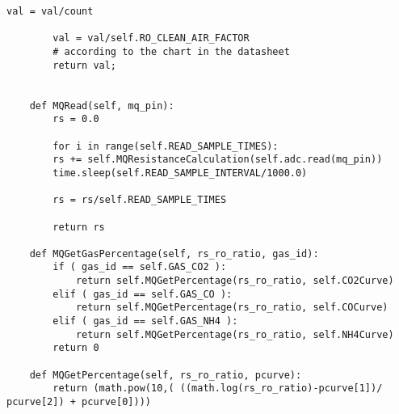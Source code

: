 \begin{lstlisting}[label=list:MQClass, caption={Auswertung der MQ-Sensorwerte}]
		val = val/count                                         
	
		val = val/self.RO_CLEAN_AIR_FACTOR                     
		# according to the chart in the datasheet 
		return val;
	
	
	def MQRead(self, mq_pin):
		rs = 0.0
		
		for i in range(self.READ_SAMPLE_TIMES):
		rs += self.MQResistanceCalculation(self.adc.read(mq_pin))
		time.sleep(self.READ_SAMPLE_INTERVAL/1000.0)
		
		rs = rs/self.READ_SAMPLE_TIMES
		
		return rs
	
	def MQGetGasPercentage(self, rs_ro_ratio, gas_id):
		if ( gas_id == self.GAS_CO2 ):
			return self.MQGetPercentage(rs_ro_ratio, self.CO2Curve)
		elif ( gas_id == self.GAS_CO ):
			return self.MQGetPercentage(rs_ro_ratio, self.COCurve)
		elif ( gas_id == self.GAS_NH4 ):
			return self.MQGetPercentage(rs_ro_ratio, self.NH4Curve)
		return 0

	def MQGetPercentage(self, rs_ro_ratio, pcurve):
		return (math.pow(10,( ((math.log(rs_ro_ratio)-pcurve[1])/ pcurve[2]) + pcurve[0])))
	

\end{lstlisting}